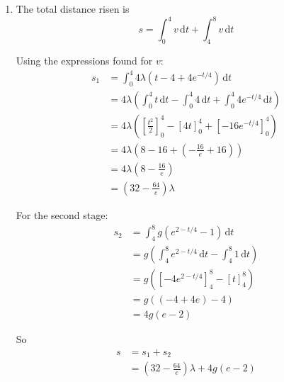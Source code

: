 \documentclass[leqno]{article}
\begin{document}
\begin{enumerate}[
  label=\textbf{\arabic*.},
  leftmargin=*,
  topsep=0pt,
  partopsep=0pt,
  parsep=0pt
]
\begin{djsSolution}
\begin{enumerate}[label=\textbf{(\alph*)}]
\begin{enumerate}[label=(\roman*)]
    From part (c)(ii):
    \[
    v(4)=g(e-1)
    \]

    Therefore
    \begin{align*}
    \frac{16\lambda}{e} &= g(e-1) \\
    \lambda &= \frac{ge(e-1)}{16} \\
    &= \frac{g(e^2-e)}{16}
    \end{align*}

    With $g=9.8$:
    \[
    \lambda \approx \frac{9.8\times e(e-1)}{16} \approx 2.86
    \]

    So
    \[
    \lambda = \frac{ge(e-1)}{16} \approx 2.86
    \]
  \end{enumerate}

  \item The total distance risen is
  \[
  s=\int_0^4 v\, \mathrm{d}t+\int_4^8 v\, \mathrm{d}t
  \]

  Using the expressions found for $v$:
  \begin{align*}
  s_1 &= \int_0^4 4\lambda\left(t-4+4e^{-t/4}\right)\, \mathrm{d}t \\
  &= 4\lambda\left(\int_0^4 t\, \mathrm{d}t-\int_0^4 4\, \mathrm{d}t+\int_0^4 4e^{-t/4}\, \mathrm{d}t\right) \\
  &= 4\lambda\left(\left[\frac{t^2}{2}\right]_0^4-\left[4t\right]_0^4+\left[-16e^{-t/4}\right]_0^4\right) \\
  &= 4\lambda\left(8-16+\left(-\frac{16}{e}+16\right)\right) \\
  &= 4\lambda\left(8-\frac{16}{e}\right) \\
  &= \left(32-\frac{64}{e}\right)\lambda
  \end{align*}

  For the second stage:
  \begin{align*}
  s_2 &= \int_4^8 g\left(e^{2-t/4}-1\right)\, \mathrm{d}t \\
  &= g\left(\int_4^8 e^{2-t/4}\, \mathrm{d}t-\int_4^8 1\, \mathrm{d}t\right) \\
  &= g\left(\left[-4e^{2-t/4}\right]_4^8-\left[t\right]_4^8\right) \\
  &= g\left((-4+4e)-4\right) \\
  &= 4g(e-2)
  \end{align*}

  So
  \begin{align*}
  s &= s_1+s_2 \\
  &= \left(32-\frac{64}{e}\right)\lambda+4g(e-2)
  \end{align*}


\end{enumerate}
\end{djsSolution}
\end{enumerate}
\end{document}
